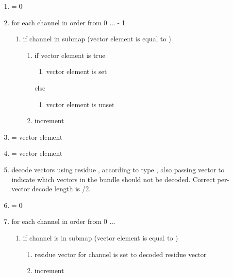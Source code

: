 \begin{enumerate}
 \item \varname{[ch]} = 0
 \item for each channel \varname{[j]} in order from 0 ...  - 1
  \begin{enumerate}
   \item if channel \varname{[j]} in submap \varname{[i]} (vector  element \varname{[j]} is equal to \varname{[i]})
    \begin{enumerate}
     \item if vector \varname{[no_residue]} element \varname{[j]} is true
      \begin{enumerate}
       \item vector  element \varname{[ch]} is set
      \end{enumerate}
     else
      \begin{enumerate}
       \item vector  element \varname{[ch]} is unset
      \end{enumerate}

     \item increment \varname{[ch]}
    \end{enumerate}

  \end{enumerate}
 \item {} = vector  element \varname{[i]}
 \item {} = vector  element 
 \item decode \varname{[ch]} vectors using residue , according to type , also passing vector  to indicate which vectors in the bundle should not be decoded. Correct per-vector decode length is \varname{[n]}/2.
 \item \varname{[ch]} = 0
 \item for each channel \varname{[j]} in order from 0 ... 
  \begin{enumerate}
   \item if channel \varname{[j]} is in submap \varname{[i]} (vector  element \varname{[j]} is equal to \varname{[i]})
    \begin{enumerate}
     \item residue vector for channel \varname{[j]} is set to decoded residue vector \varname{[ch]}
     \item increment \varname{[ch]}
    \end{enumerate}

  \end{enumerate}

\end{enumerate}




